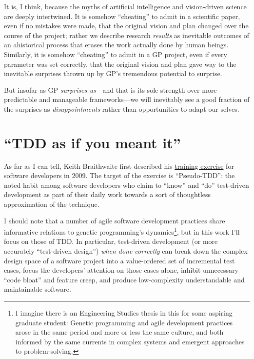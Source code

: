 It is, I think, because the myths of artificial intelligence and vision-driven science are deeply intertwined. It is somehow ``cheating'' to admit in a scientific paper, even if no mistakes were made, that the original vision and plan changed over the course of the project; rather we describe research \emph{results} as inevitable outcomes of an ahistorical process that erases the work actually done by human beings. Similarly, it is somehow ``cheating'' to admit in a GP project, even if every parameter was set correctly, that the original vision and plan gave way to the inevitable surprises thrown up by GP's tremendous potential to surprise.

But insofar as GP \emph{surprises us}---and that is its sole strength over more predictable and manageable frameworks---we will inevitably see a good fraction of the surprises as \emph{disappointments} rather than opportunities to adapt our selves.

\section{``TDD as if you meant it''}\hypertarget{tdd-as-if-you-meant-it}{}\label{tdd-as-if-you-meant-it}

As far as I can tell, Keith Braithwaite first described his \href{http://cumulative-hypotheses.org/2011/08/30/tdd-as-if-you-meant-it/}{training exercise} for software developers in 2009. The target of the exercise is ``Pseudo-TDD'': the noted habit among software developers who claim to ``know'' and ``do'' test-driven development as part of their daily work towards a sort of thoughtless approximation of the technique.

I should note that a number of agile software development practices share informative relations to genetic programming's dynamics\footnote{I imagine there is an Engineering Studies thesis in this for some aspiring graduate student: Genetic programming and agile development practices arose in the same period and more or less the same culture, and both informed by the same currents in complex systems and emergent approaches to problem-solving.}, but in this work I'll focus on those of TDD. In particular, test-driven development (or more accurately ``test-driven design'') \emph{when done correctly} can break down the complex design space of a software project into a value-ordered set of incremental test cases, focus the developers' attention on those cases alone, inhibit unnecessary ``code bloat'' and feature creep, and produce low-complexity understandable and maintainable software.

